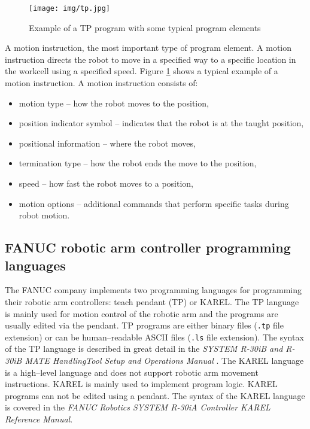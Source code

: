 \begin{figure}[h]
    \centering
    \texttt{[image: img/tp.jpg]}
    \caption{Example of a TP program with some typical program elements \cite{fanuchandling}}
    \label{fig:tp}
\end{figure}

A motion instruction, the most important type of program element. A motion instruction directs the robot to move in a specified way to a specific location in the workcell
using a specified speed. Figure \ref{fig:tp} shows a typical example of a motion instruction. A motion instruction consists of:

\begin{itemize}

\item motion type -- how the robot moves to the position,
\item position indicator symbol -- indicates that the robot is at the taught position,
\item positional information -- where the robot moves,
\item termination type -- how the robot ends the move to the position,
\item speed -- how fast the robot moves to a position,
\item motion options -- additional commands that perform specific tasks during robot motion.

\end{itemize}


\subsection{FANUC robotic arm controller programming languages}

The FANUC company implements two programming languages for programming their robotic arm controllers: teach pendant (TP) or KAREL. The TP language is mainly used for motion control of the robotic arm and the programs are usually edited via the pendant. TP programs are either binary files (\texttt{.tp} file extension) or can be human--readable ASCII files (\texttt{.ls} file extension). The syntax of the TP language is described in great detail in the \emph{SYSTEM R-30iB and R-30iB MATE HandlingTool Setup and Operations Manual} \cite{fanuchandling}. The KAREL language is a high--level language and does not support robotic arm movement instructions. KAREL is mainly used to implement program logic. KAREL programs can not be edited using a pendant. The syntax of the KAREL language is covered in the \emph{FANUC Robotics SYSTEM R-30iA Controller KAREL Reference Manual}.


